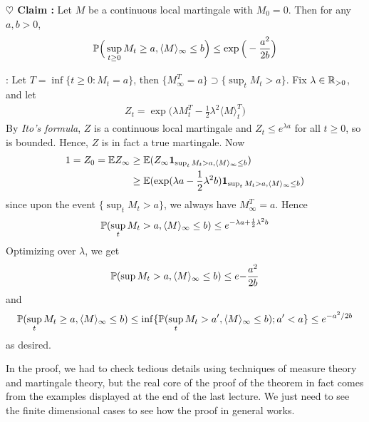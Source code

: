 \documentclass[12pt,a4paper]{article}
\newenvironment{proof}
{\begin{changemargin}{0.5cm}{0.5cm} 
	}%
	{\end{changemargin}
}
\newenvironment{subproof}
{\begin{changemargin}{0.5cm}{0.5cm} 
	}%
	{\end{changemargin}
}
\newenvironment{p}
{\begin{proof} 
	}%
	{\end{proof}
}
\begin{document}
\begin{p}
\textbf{$\heartsuit$ Claim :} Let $M$ be a continuous local martingale with $M_0 =0$. Then for any $a,b>0$,
\begin{align*}
\mathbb{P}\Big( \sup_{t\geq 0} M_t \geq a, \langle M\rangle_{\infty} \leq b\Big) \leq \exp \Big( -\frac{a^2}{2b} \Big)
\end{align*}
\begin{subproof}
: Let $T=\inf \{t\geq 0 : M_t =a \}$, then $\{M_{\infty}^{T} =a \} \supset \{ \sup_t M_t >a\}$. Fix $\lambda \in \mathbb{R}_{>0}$, and let
\begin{align*}
Z_t = \exp \Big( \lambda M_t^T -\frac{1}{2} \lambda^2 \langle M \rangle_t^T \Big)
\end{align*}
By \emph{Ito's formula}, $Z$ is a continuous local martingale and $Z_t \leq e^{\lambda a}$ for all $t\geq 0$, so is bounded. Hence, $Z$ is in fact a true martingale. Now
\begin{align*}
1 = Z_0 = \mathbb{E} Z_{\infty} &\geq \mathbb{E}(Z_{\infty} \bm{1}_{\sup_{t} M_t >a, \langle M \rangle_{\infty} \leq b}) \\
&\geq \mathbb{E} (\exp (\lambda a -\frac{1}{2} \lambda^2 b) \bm{1}_{\sup_{t} M_t >a, \langle M \rangle_{\infty} \leq b})
\end{align*}
since upon the event $\{\sup_{t} M_t >a\}$, we always have $M_{\infty}^T =a$. Hence
\begin{align*}
\mathbb{P} (\sup_t M_t >a, \langle M \rangle_{\infty} \leq b) \leq e^{-\lambda a + \frac{1}{2} \lambda^2 b}
\end{align*} 
Optimizing over $\lambda$, we get
\begin{align*}
\mathbb{P} (\sup M_t >a, \langle M \rangle_{\infty} \leq b) \leq e{-\frac{a^2}{2b}}
\end{align*}
and
\begin{align*}
\mathbb{P}(\sup_t M_t \geq a, \langle M \rangle_{\infty} \leq b) \leq \inf \{ \mathbb{P}(\sup_t M_t >a', \langle M\rangle_{\infty} \leq b) ; a'<a \} \leq e^{-a^2 /2b}
\end{align*}
as desired.
\end{subproof}
\eop 
\end{p}
\s

In the proof, we had to check tedious details using techniques of measure theory and martingale theory, but the real core of the proof of the theorem in fact comes from the examples displayed at the end of the last lecture. We just need to see the finite dimensional cases to see how the proof in general works. 
\s

\newday
\end{document}
